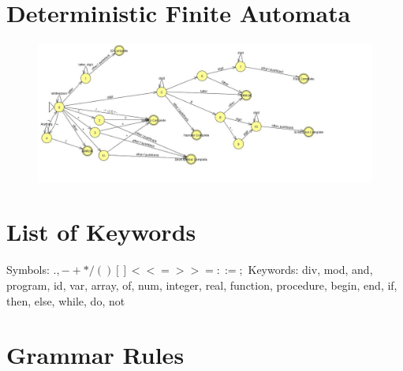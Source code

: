 \documentclass[10]{article}
\begin{document}
\newpage
\begin{appendices}
\section{Deterministic Finite Automata}
\begin{figure}[!ht]
	\includegraphics[width=\textwidth]{ScannerDFA.jpg}
\end{figure}


\section{List of Keywords}
Symbols: $ . , - + * / ( ) { } [ ] { } < <= > >= : := ;$  
\newline
Keywords: div, mod, and, program, id, var, array, of, num, integer, real, function, procedure, begin, end, if, then, else, while, do, not
\section{Grammar Rules}


\end{appendices}
\end{document}
